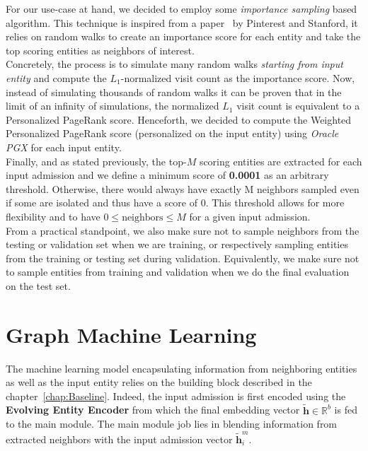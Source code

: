 For our use-case at hand, we decided to employ some \textit{importance sampling} based algorithm. This technique is inspired from a paper~\cite{DBLP:journals/corr/abs-1806-01973} by Pinterest and Stanford, it relies on random walks to create an importance score for each entity and take the top scoring entities as neighbors of interest. \\

Concretely, the process is to simulate many random walks \emph{starting from input entity} and compute the $L_1$-normalized visit count as the importance score. Now, instead of simulating thousands of random walks it can be proven that in the limit of an infinity of simulations, the normalized $L_1$ visit count is equivalent to a Personalized PageRank score. Henceforth, we decided to compute the Weighted Personalized PageRank score (personalized on the input entity) using \textit{Oracle PGX} for each input entity. \\

Finally, and as stated previously, the top-$M$ scoring entities are extracted for each input admission and we define a minimum score of \textbf{0.0001} as an arbitrary threshold. Otherwise, there would always have exactly M neighbors sampled even if some are isolated and thus have a score of 0. This threshold allows for more flexibility and to have $0 \leq \mbox{neighbors} \leq M$ for a given input admission. \\

From a practical standpoint, we also make sure not to sample neighbors from the testing or validation set when we are training, or respectively sampling entities from the training or testing set during validation. Equivalently, we make sure not to sample entities from training and validation when we do the final evaluation on the test set.

\section{Graph Machine Learning}
The machine learning model encapsulating information from neighboring entities as well as the input entity relies on the building block described in the chapter~\ref{chap:Baseline}. Indeed, the input admission is first encoded using the \textbf{Evolving Entity Encoder} from which the final embedding vector $\bm{\tilde{h}} \in \mathbb{R}^{b}$ is fed to the main module. The main module job lies in blending information from extracted neighbors with the input admission vector $\bm{\tilde{h}}_i^m$. \\

